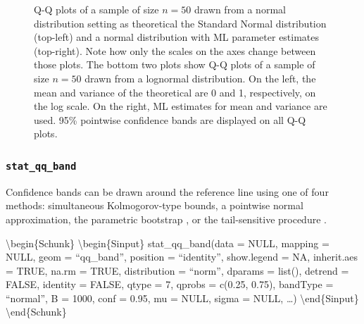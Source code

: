 \begin{Schunk}
\begin{figure}
\caption[Q-Q plots of a sample of size $n=50$ drawn from a normal distribution setting as theoretical the Standard Normal distribution (top-left) and a normal distribution with ML parameter estimates (top-right)]{Q-Q plots of a sample of size $n=50$ drawn from a normal distribution setting as theoretical the Standard Normal distribution (top-left) and a normal distribution with ML parameter estimates (top-right). Note how only the scales on the axes change between those plots. The bottom two plots show Q-Q plots of a sample of size $n=50$ drawn from a lognormal distribution. On the left, the mean and variance of the theoretical are 0 and 1, respectively, on the log scale. On the right, ML estimates for mean and variance are used. 95\% pointwise confidence bands are displayed on all Q-Q plots. }\label{fig:qqline}
\end{figure}
\end{Schunk}

\hypertarget{stat_qq_band}{%
\subsubsection{\texorpdfstring{\texttt{stat\_qq\_band}}{stat\_qq\_band}}\label{stat_qq_band}}

Confidence bands can be drawn around the reference line using one of
four methods: simultaneous Kolmogorov-type bounds, a pointwise normal
approximation, the parametric bootstrap \citep{Davison:1997}, or the
tail-sensitive procedure \citep{Aldor-Noiman2013-xw}.

\textbackslash{}begin\{Schunk\} \textbackslash{}begin\{Sinput\}
stat\_qq\_band(data = NULL, mapping = NULL, geom = ``qq\_band'',
position = ``identity'', show.legend = NA, inherit.aes = TRUE, na.rm =
TRUE, distribution = ``norm'', dparams = list(), detrend = FALSE,
identity = FALSE, qtype = 7, qprobs = c(0.25, 0.75), bandType =
``normal'', B = 1000, conf = 0.95, mu = NULL, sigma = NULL, \ldots{})
\textbackslash{}end\{Sinput\} \textbackslash{}end\{Schunk\}

